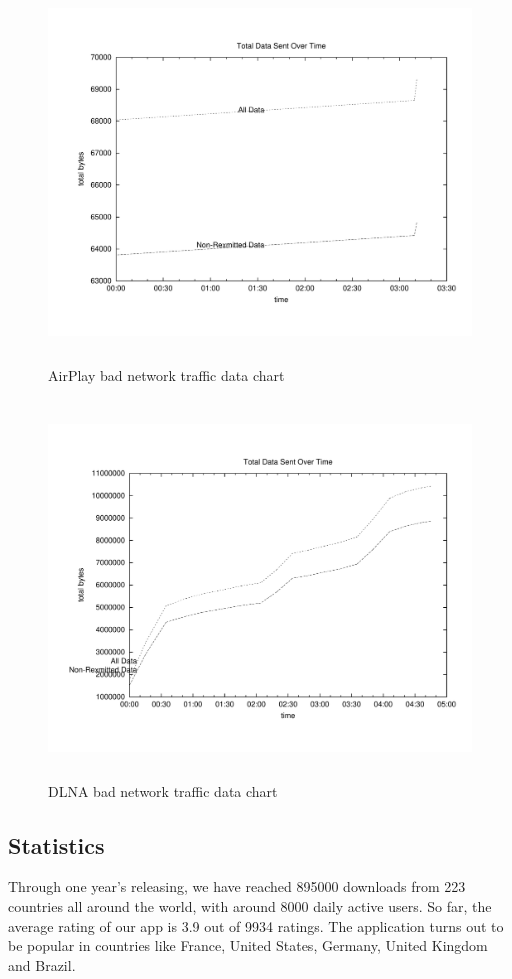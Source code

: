 \begin{figure}[htb]
\centering \includegraphics[height=10cm]{charts/AirPlay_traffic_15loss_data}
\caption{AirPlay bad network traffic data chart \label{chart6}}
\end{figure}
\begin{figure}[htb]
\centering \includegraphics[height=10cm]{charts/dlna_traffic_15loss_data}
\caption{DLNA bad network traffic data chart \label{chart6}}
\end{figure}

\subsection{Statistics}
Through one year's releasing, we have reached 895000 downloads from 223
countries all around the world, with around 8000 daily active users. So far, the
average rating of our app is 3.9 out of 9934 ratings. The application turns out
to be popular in countries like France, United States, Germany, United Kingdom
and Brazil.

